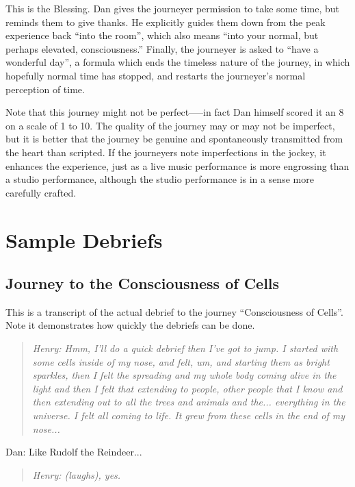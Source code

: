 \documentclass[12pt]{book}
\begin{document}
This is the Blessing. Dan gives the journeyer permission to take some
time, but reminds them to give thanks. He explicitly guides them down
from the peak experience back ``into the room'', which also means
``into your normal, but perhaps elevated, consciousness.''  Finally,
the journeyer is asked to ``have a wonderful day'', a formula which
ends the timeless nature of the journey, in which hopefully normal
time has stopped, and restarts the journeyer's normal perception of
time.


\hrulefill

Note that this journey might not be perfect—--in fact Dan himself
scored it an 8 on a scale of 1 to 10.  The quality of the journey may
or may not be imperfect, but it is better that the journey be genuine
and spontaneously transmitted from the heart than scripted. If the
journeyers note imperfections in the jockey, it enhances the
experience, just as a live music performance is more engrossing than a
studio performance, although the studio performance is in a sense more
carefully crafted.

\chapter{Sample Debriefs}

\section{Journey to the Consciousness of Cells}

This is a transcript of the actual debrief to the journey “Consciousness of Cells”. Note it demonstrates how quickly the debriefs can be done.


\begin{quote}{\em
Henry: Hmm, I'll do a quick debrief then I've got to jump. I started with some cells inside of my nose, and felt, um, and starting them as bright sparkles, then I felt the spreading and my whole body coming alive in the light and then I felt that extending to people, other people that I know and then extending out to all the trees and animals and the... everything in the universe. I felt all coming to life. It grew from these cells in the end of my nose...
}\end{quote}

Dan: Like Rudolf the Reindeer...

\begin{quote}{\em
Henry: (laughs), yes.
}\end{quote}    
\end{document}
